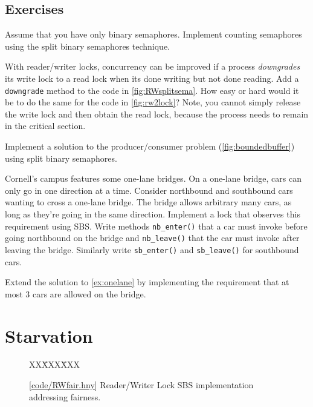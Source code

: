 \documentclass{report}
\newcommand{\harmonysource}[1]{
\begin{tabbing}
XX\=XXX\=XXX\kill
    
\end{tabbing}
}
\newcommand{\harmonylink}[1]{%
[\href{https://www.cs.cornell.edu/home/rvr/harmony/#1}{\underline{#1}}]%
}
\newenvironment{code}{
\tcolorbox
}{
\endtcolorbox
}
\begin{document}
\section*{Exercises}
\begin{problems}
\item Assume that you have only binary semaphores.
Implement counting semaphores using the split binary semaphores technique.
\item With reader/writer locks,
concurrency can be improved if a process \emph{downgrades} its write lock
to a read lock when its done writing but not done reading.  Add
a \texttt{downgrade} method to the code in \autoref{fig:RWsplitsema}.
How easy or hard would it be to do the same for the code in
\autoref{fig:rw2lock}?
Note, you cannot simply release the
write lock and then obtain the read lock, because the process needs
to remain in the critical section.
\item \label{ex:onelane} Implement a solution to the producer/consumer problem
(\autoref{fig:boundedbuffer}) using split binary semaphores.
\item \label{ex:onelane} Cornell's campus features some one-lane bridges.
On a one-lane bridge,
cars can only go in one direction at a time. Consider northbound
and southbound cars wanting to cross a one-lane bridge.
The bridge allows arbitrary many cars, as long as they're going in the
same direction.
Implement a lock that observes this requirement using SBS.  Write methods
\texttt{nb\_enter()} that a car must invoke before going northbound on
the bridge and \texttt{nb\_leave()} that the car must invoke after leaving
the bridge.  Similarly write \texttt{sb\_enter()} and \texttt{sb\_leave()}
for southbound cars.
\item Extend the solution to \autoref{ex:onelane} by implementing the
requirement that at most 3 cars are allowed on the bridge.

\end{problems}

\chapter{Starvation}
\label{ch:starvation}
%

%

\begin{figure}
\begin{code}
{\small
\harmonysource{RWfair}
}
\end{code}
\caption{\harmonylink{code/RWfair.hny} Reader/Writer Lock SBS implementation addressing fairness.}
\label{fig:RWfair}
\end{figure}
\end{document}
